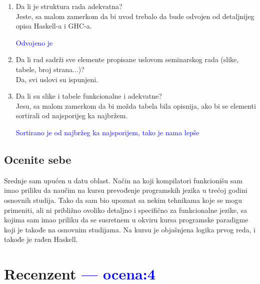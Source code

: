 \documentclass[a4paper]{report}
\newcommand{\odgovor}[1]{\textcolor{blue}{#1}}
\begin{document}
\begin{enumerate}
		\item Da li je struktura rada adekvatna?\\
		Jeste, sa malom zamerkom da bi uvod trebalo da bude odvojen od detaljnijeg opisa Haskell-a i GHC-a.
		
		\odgovor{Odvojeno je}
		
		\item Da li rad sadrži sve elemente propisane uslovom seminarskog rada (slike, tabele, broj strana...)?\\
		Da, svi uslovi su ispunjeni.
		
		\item Da li su slike i tabele funkcionalne i adekvatne?\\
		Jesu, sa malom zamerkom da bi možda tabela bila opisnija, ako bi se elementi sortirali od najsporijeg ka najbržem.
		
		\odgovor{Sortirano je od najbržeg ka najsporijem, tako je nama lepše}
		
	\end{enumerate}
	
	\section{Ocenite sebe}
	
	Srednje sam upućen u datu oblast. Način na koji kompilatori funkcionišu sam imao priliku da naučim na kursu prevođenje programskih jezika u trećoj godini osnovnih studija. Tako da sam bio upoznat sa nekim tehnikama koje se mogu primeniti, ali ni približno ovoliko detaljno i specifično za funkcionalne jezike, sa kojima sam imao priliku da se susretnem u okviru kursa programske paradigme koji je takođe na osnovnim studijama. Na kursu je objašnjena logika prvog reda, i takođe je rađen Haskell.
	
	\chapter{Recenzent \odgovor{--- ocena:4} }
	
	
\end{document}
